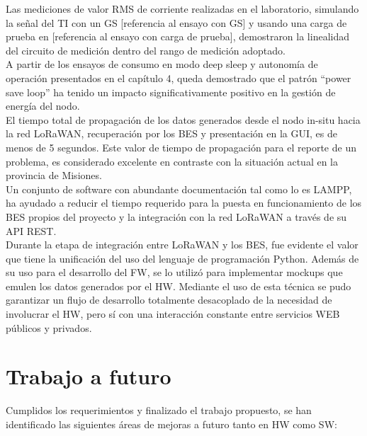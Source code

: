 Las mediciones de valor RMS de corriente realizadas en el laboratorio, simulando la señal del TI con un GS [referencia al ensayo con GS] y usando una carga de prueba en [referencia al ensayo con carga de prueba], demostraron la linealidad del circuito de medición dentro del rango de medición adoptado.\\
A partir de los ensayos de consumo en modo deep sleep y autonomía de operación presentados en el capítulo 4, queda demostrado que el patrón “power save loop” ha tenido un impacto significativamente positivo en la gestión de energía del nodo.\\
El tiempo total de propagación de los datos generados desde el nodo in-situ hacia la red LoRaWAN, recuperación por los BES y presentación en la GUI, es de menos de 5 segundos. Este valor de tiempo de propagación para el reporte de un problema, es considerado excelente en contraste con la situación actual en la provincia de Misiones.\\
Un conjunto de software con abundante documentación tal como lo es LAMPP, ha ayudado a reducir el tiempo requerido para la puesta en funcionamiento de los BES propios del proyecto y la integración con la red LoRaWAN a través de su API REST.\\
Durante la etapa de integración entre LoRaWAN y los BES, fue evidente el valor que tiene la unificación del uso del lenguaje de programación Python. Además de su uso para el desarrollo del FW, se lo utilizó para implementar mockups que emulen los datos generados por el HW. Mediante el uso de esta técnica se pudo garantizar un flujo de desarrollo totalmente desacoplado de la necesidad de involucrar el HW, pero sí con una interacción constante entre servicios WEB públicos y privados.\\


\section{Trabajo a futuro}

Cumplidos los requerimientos y finalizado el trabajo propuesto, se han identificado las siguientes áreas de mejoras a futuro tanto en HW como SW:

